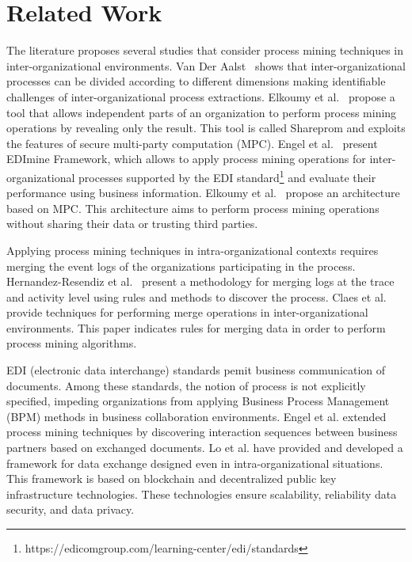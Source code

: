\section{Related Work}
\label{sec:background}

The literature proposes several studies that consider process mining techniques in inter-organizational environments.  Van Der Aalst~\cite{van2011intra} shows that inter-organizational processes can be divided according to different dimensions making identifiable challenges of inter-organizational process extractions. Elkoumy et al.~\cite{elkoumy2020shareprom} propose a tool that allows independent parts of an organization to perform process mining operations by revealing only the result. This tool is called Shareprom and exploits the features of secure multi-party computation (MPC). Engel et al.~\cite{engel2016analyzing}
present EDImine Framework, which allows to apply process mining operations for inter-organizational processes supported by the EDI standard\footnote{https://edicomgroup.com/learning-center/edi/standards} and evaluate their performance using business information.
Elkoumy et al.~\cite{elkoumy2020secure} propose an architecture based on MPC. This architecture aims to perform process mining operations without sharing their data or trusting third parties.


Applying process mining techniques in intra-organizational contexts requires merging the event logs of the organizations participating in the process. Hernandez-Resendiz et al.~\cite{hernandez2021merging} present a methodology for merging logs at the trace and activity level using rules and methods to discover the process. Claes et al.~\cite{claes2014merging} provide techniques for performing merge operations in inter-organizational environments. This paper indicates rules for merging data in order to perform process mining algorithms.

EDI (electronic data interchange) standards pemit business communication of documents. Among these standards, the notion of process is not explicitly specified, impeding organizations from applying Business Process Management (BPM) methods in business collaboration environments. Engel et al.\cite{engel2011process} extended process mining techniques by discovering interaction sequences between business partners based on exchanged documents. Lo et al.\cite{lo2020flexible} have provided and developed a framework for data exchange designed even in intra-organizational situations. This framework is based on blockchain and decentralized public key infrastructure technologies. These technologies ensure scalability, reliability data security, and data privacy.

